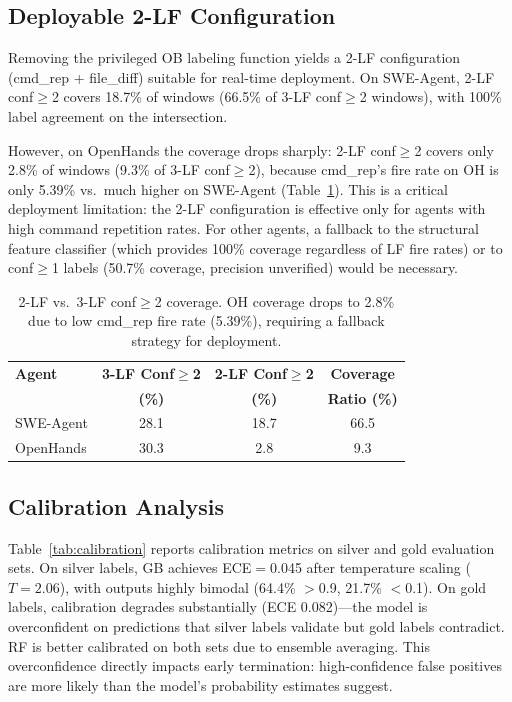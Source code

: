 \documentclass[11pt,a4paper]{article}
\begin{document}
\subsection{Deployable 2-LF Configuration}

Removing the privileged OB labeling function yields a 2-LF configuration (cmd\_rep + file\_diff) suitable for real-time deployment.
On SWE-Agent, 2-LF conf${\geq}$2 covers 18.7\% of windows (66.5\% of 3-LF conf${\geq}$2 windows), with 100\% label agreement on the intersection.

However, on OpenHands the coverage drops sharply: 2-LF conf${\geq}$2 covers only 2.8\% of windows (9.3\% of 3-LF conf${\geq}$2), because cmd\_rep's fire rate on OH is only 5.39\% vs.\ much higher on SWE-Agent (Table~\ref{tab:coverage}).
This is a critical deployment limitation: the 2-LF configuration is effective only for agents with high command repetition rates.
For other agents, a fallback to the structural feature classifier (which provides 100\% coverage regardless of LF fire rates) or to conf${\geq}$1 labels (50.7\% coverage, precision unverified) would be necessary.

\begin{table}[t]
\centering
\small
\begin{tabular}{lccc}
\toprule
\textbf{Agent} & \textbf{3-LF Conf$\geq$2} & \textbf{2-LF Conf$\geq$2} & \textbf{Coverage} \\
 & \textbf{(\%)} & \textbf{(\%)} & \textbf{Ratio (\%)} \\
\midrule
SWE-Agent & 28.1 & 18.7 & 66.5 \\
OpenHands & 30.3 & 2.8 & 9.3 \\
\bottomrule
\end{tabular}
\caption{2-LF vs.\ 3-LF conf${\geq}$2 coverage. OH coverage drops to 2.8\% due to low cmd\_rep fire rate (5.39\%), requiring a fallback strategy for deployment.}
\label{tab:coverage}
\end{table}

\subsection{Calibration Analysis}

Table~\ref{tab:calibration} reports calibration metrics on silver and gold evaluation sets.
On silver labels, GB achieves ECE${=}$0.045 after temperature scaling ($T{=}2.06$), with outputs highly bimodal (64.4\% $>$0.9, 21.7\% $<$0.1).
On gold labels, calibration degrades substantially (ECE 0.082)---the model is overconfident on predictions that silver labels validate but gold labels contradict.
RF is better calibrated on both sets due to ensemble averaging.
This overconfidence directly impacts early termination: high-confidence false positives are more likely than the model's probability estimates suggest.
\end{document}

